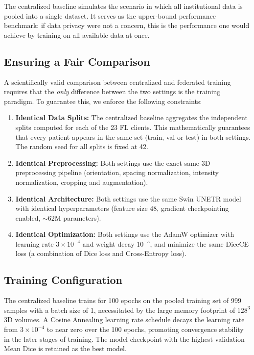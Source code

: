 \documentclass{article}
\begin{document}
The centralized baseline simulates the scenario in which all institutional data is pooled into a single dataset. It serves as the upper-bound performance benchmark: if data privacy were not a concern, this is the performance one would achieve by training on all available data at once.

\subsection{Ensuring a Fair Comparison}
\label{sec:fair}

A scientifically valid comparison between centralized and federated training requires that the \textit{only} difference between the two settings is the training paradigm. To guarantee this, we enforce the following constraints:

\begin{enumerate}
    \item \textbf{Identical Data Splits:} The centralized baseline aggregates the independent splits computed for each of the 23 FL clients. This mathematically guarantees that every patient appears in the same set (train, val or test) in both settings. The random seed for all splits is fixed at 42.

    \item \textbf{Identical Preprocessing:} Both settings use the exact same 3D preprocessing pipeline (orientation, spacing normalization, intensity normalization, cropping and augmentation).

    \item \textbf{Identical Architecture:} Both settings use the same Swin UNETR model with identical hyperparameters (feature size 48, gradient checkpointing enabled, $\sim$62M parameters).

    \item \textbf{Identical Optimization:} Both settings use the AdamW optimizer with learning rate $3 \times 10^{-4}$ and weight decay $10^{-5}$, and minimize the same DiceCE loss (a combination of Dice loss and Cross-Entropy loss).
\end{enumerate}

\subsection{Training Configuration}

The centralized baseline trains for 100 epochs on the pooled training set of 999 samples with a batch size of 1, necessitated by the large memory footprint of $128^3$ 3D volumes. A Cosine Annealing learning rate schedule decays the learning rate from $3 \times 10^{-4}$ to near zero over the 100 epochs, promoting convergence stability in the later stages of training. The model checkpoint with the highest validation Mean Dice is retained as the best model.
\end{document}
